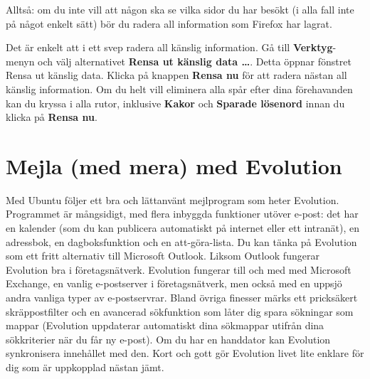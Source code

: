 \documentclass[a4paper,final]{memoir} %
\begin{document}
Alltså: om du inte vill att någon ska se vilka sidor du har besökt (i alla fall inte på något enkelt sätt) bör du radera all information som Firefox har lagrat.

Det är enkelt att i ett svep radera all känslig information. Gå till \textbf{Verktyg}-menyn och välj alternativet \textbf{Rensa ut känslig data \ldots{}}. Detta öppnar fönstret Rensa ut känslig data. Klicka på knappen \textbf{Rensa nu} för att radera nästan all känslig information. Om du helt vill eliminera alla spår efter dina förehavanden kan du kryssa i alla rutor, inklusive \textbf{Kakor} och \textbf{Sparade lösenord} innan du klicka på \textbf{Rensa nu}. 

\section{Mejla (med mera) med Evolution}


Med Ubuntu följer ett bra och lättanvänt mejlprogram som heter Evolution. Programmet är mångsidigt, med flera inbyggda funktioner utöver e-post: det har en kalender (som du kan publicera automatiskt på internet eller ett intranät), en adressbok, en dagboksfunktion och en att-göra-lista. Du kan tänka på Evolution som ett fritt alternativ till Microsoft Outlook. Liksom Outlook fungerar Evolution bra i företagsnätverk. Evolution fungerar till och med med Microsoft Exchange, en vanlig e-postserver i företagsnätverk, men också med en uppsjö andra vanliga typer av e-postservrar. Bland övriga finesser märks ett pricksäkert skräppostfilter och en avancerad sökfunktion som låter dig spara sökningar som mappar (Evolution uppdaterar automatiskt dina sökmappar utifrån dina sökkriterier när du får ny e-post). Om du har en handdator kan Evolution synkronisera innehållet med den. Kort och gott gör Evolution livet lite enklare för dig som är uppkopplad nästan jämt. 
\end{document}
